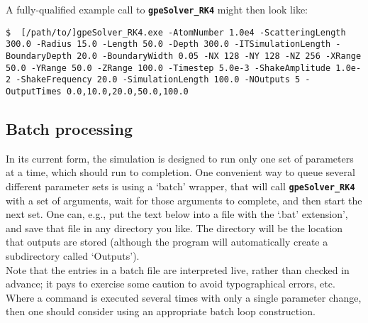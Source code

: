 \documentclass{jakedoc}
\let\oldtexttt\texttt
\renewcommand\texttt[1]{\textbf{\oldtexttt{#1}}}
\begin{document}
A fully-qualified example call to \texttt{gpeSolver\_RK4} might then look like:
\begin{lstlisting}
$  [/path/to/]gpeSolver_RK4.exe -AtomNumber 1.0e4 -ScatteringLength 300.0 -Radius 15.0 -Length 50.0 -Depth 300.0 -ITSimulationLength -BoundaryDepth 20.0 -BoundaryWidth 0.05 -NX 128 -NY 128 -NZ 256 -XRange 50.0 -YRange 50.0 -ZRange 100.0 -Timestep 5.0e-3 -ShakeAmplitude 1.0e-2 -ShakeFrequency 20.0 -SimulationLength 100.0 -NOutputs 5 -OutputTimes 0.0,10.0,20.0,50.0,100.0
\end{lstlisting}

\subsection{Batch processing}
In its current form, the simulation is designed to run only one set of parameters at a time, which should run to completion. One convenient way to queue several different parameter sets is using a `batch' wrapper, that will call \texttt{gpeSolver\_RK4} with a %
set of arguments, wait for those arguments to complete, and then start the next set.
One can, e.g., put the text below into a file with the `.bat' extension', and save that file in any directory you like.
The directory will be the location that outputs are stored (although the program will automatically create a subdirectory called `Outputs').\\

Note that the entries in a batch file are interpreted live, rather than checked in advance; it pays to exercise some caution to avoid typographical errors, etc. 
Where a command is executed several times with only a single parameter change, then one should consider using an appropriate batch loop construction.\\
\end{document}
